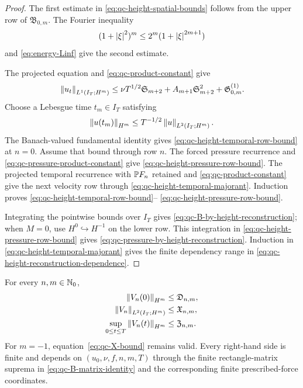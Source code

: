 \begin{proof}
The first estimate in \eqref{eq:qc-height-spatial-bounds} follows from the
upper row of \(\mathfrak B_{0,m}\).  The Fourier inequality
\[
 (1+\left|\xi\right|^2)^m\le2^m(1+\left|\xi\right|^{2m+1})
\]
and \eqref{eq:energy-Linf} give the second estimate.

The projected equation and \eqref{eq:qc-product-constant} give
\[
 \left\lVert u_t\right\rVert_{L^1(I_T;H^m)}
 \le\nu T^{1/2}\mathfrak S_{m+2}
 +A_{m+1}\mathfrak S_{m+2}^2
 +\mathfrak G^{(1)}_{0,m}.
\]
Choose a Lebesgue time \(t_m\in I_T\) satisfying
\[
 \left\lVert u(t_m)\right\rVert_{H^m}
 \le T^{-1/2}\left\lVert u\right\rVert_{L^2(I_T;H^m)}.
\]
The Banach-valued fundamental identity gives
\eqref{eq:qc-height-temporal-row-bound} at \(n=0\).
Assume that bound through row \(n\).  The forced pressure recurrence and
\eqref{eq:qc-pressure-product-constant} give
\eqref{eq:qc-height-pressure-row-bound}.  The projected temporal recurrence
with \(\mathbb P F_n\) retained and \eqref{eq:qc-product-constant} give the next velocity row through
\eqref{eq:qc-height-temporal-majorant}.  Induction proves
\eqref{eq:qc-height-temporal-row-bound}--%
\eqref{eq:qc-height-pressure-row-bound}.

Integrating the pointwise bounds over \(I_T\) gives
\eqref{eq:qc-B-by-height-reconstruction}; when \(M=0\), use
\(H^0\hookrightarrow H^{-1}\) on the lower row.  This integration in
\eqref{eq:qc-height-pressure-row-bound} gives
\eqref{eq:qc-pressure-by-height-reconstruction}.  Induction in
\eqref{eq:qc-height-temporal-majorant} gives the finite dependency range in
\eqref{eq:qc-height-reconstruction-dependence}.
\end{proof}

\begin{lemma}
\label{lem:qc-closed-velocity-majorants}
For every \(n,m\in\mathbb N_0\),
\begin{align}
 \left\lVert V_n(0)\right\rVert_{H^m}&\le\mathfrak D_{n,m},
 \label{eq:qc-D-bound}\\
 \left\lVert V_n\right\rVert_{L^2(I_T;H^m)}&\le\mathfrak X_{n,m},
 \label{eq:qc-X-bound}\\
 \sup_{0\le t\le T}\left\lVert V_n(t)\right\rVert_{H^m}
 &\le\mathfrak Z_{n,m}.
 \label{eq:qc-Z-bound}
\end{align}
For \(m=-1\), equation~\eqref{eq:qc-X-bound} remains valid.  Every
right-hand side is finite and depends on \((u_0,\nu,f,n,m,T)\) through the
finite rectangle-matrix suprema in \eqref{eq:qc-B-matrix-identity} and the
corresponding finite prescribed-force coordinates.
\end{lemma}

